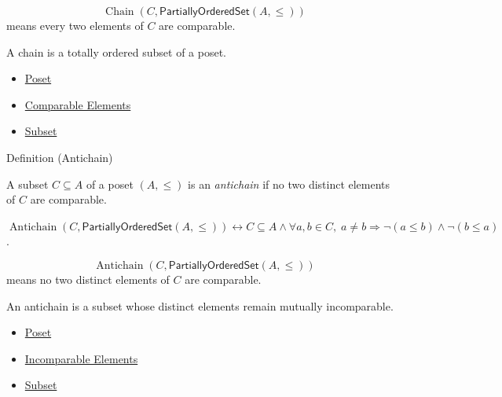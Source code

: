 \begin{remark*}
\[
  \operatorname{Chain}(C,\mathsf{PartiallyOrderedSet}(A,\leq))
\] means every two
elements of $C$ are comparable.
\end{remark*}

\begin{remark*}[Interpretation]
A chain is a totally ordered subset of a poset.
\end{remark*}

\begin{dependencies}
\begin{itemize}
  \item \hyperref[def:poset]{Poset}
  \item \hyperref[def:comparable]{Comparable Elements}
  \item \hyperref[def:subset]{Subset}
\end{itemize}
\end{dependencies}

\begin{definitionbox}{Definition (Antichain)}
\begin{definition}[Antichain]\label{def:order-antichain}
A subset $C \subseteq A$ of a poset $(A,\leq)$ is an \emph{antichain} if no
two distinct elements of $C$ are comparable.
\end{definition}
\end{definitionbox}

\begin{remark*}
$\operatorname{Antichain}(C,\mathsf{PartiallyOrderedSet}(A,\leq))
\leftrightarrow C\subseteq A\wedge
\forall a,b\in C,\; a\neq b\Rightarrow \neg(a\leq b)\wedge\neg(b\leq a)$.
\end{remark*}

\begin{remark*}
\[
  \operatorname{Antichain}(C,\mathsf{PartiallyOrderedSet}(A,\leq))
\] means no
two distinct elements of $C$ are comparable.
\end{remark*}

\begin{remark*}[Interpretation]
An antichain is a subset whose distinct elements remain mutually incomparable.
\end{remark*}

\begin{dependencies}
\begin{itemize}
  \item \hyperref[def:poset]{Poset}
  \item \hyperref[def:incomparable]{Incomparable Elements}
  \item \hyperref[def:subset]{Subset}
\end{itemize}
\end{dependencies}

